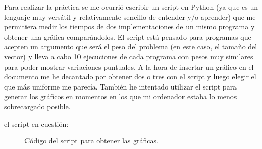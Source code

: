 \documentclass[a4paper, 11pt]{article}
\begin{document}
Para realizar la práctica se me ocurrió escribir un script en Python (ya que es un lenguaje muy versátil y relativamente sencillo de entender y/o aprender) que me permitiera medir los tiempos de dos implementaciones de un mismo programa y obtener una gráfica comparándolos. El script está pensado para programas que acepten un argumento que será el peso del problema (en este caso, el tamaño del vector) y lleva a cabo 10 ejecuciones de cada programa con pesos muy similares para poder mostrar variaciones puntuales. A la hora de insertar un gráfico en el documento me he decantado por obtener dos o tres con el script y luego elegir el que más uniforme me parecía. También he intentado utilizar el script para generar los gráficos en momentos en los que mi ordenador estaba lo menos sobrecargado posible.

el script en cuestión:

\lstset{escapechar=@,style=customPY}

\begin{figure}[!hbp]
	
	\caption{Código del script para obtener las gráficas.}
\end{figure}
\end{document}
